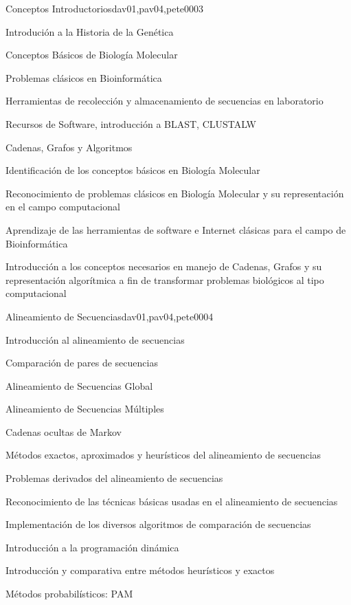 \begin{syllabus}
\begin{unit}{Conceptos Introductorios}{dav01,pav04,pete00}{0}{3}
\begin{topics}
        \item Introdución a la Historia de la Genética
        \item Conceptos Básicos de Biología Molecular
        \item Problemas clásicos en Bioinformática
        \item Herramientas de recolección y almacenamiento de secuencias en laboratorio
        \item Recursos de Software, introducción a BLAST, CLUSTALW
        \item Cadenas, Grafos y Algoritmos
    \end{topics}
    \begin{learningoutcomes}
        \item Identificación de los conceptos básicos en Biología Molecular
        \item Reconocimiento de problemas clásicos en Biología Molecular y su representación en el campo computacional
        \item Aprendizaje de las herramientas de software e Internet clásicas para el campo de Bioinformática
        \item Introducción a los conceptos necesarios en manejo de Cadenas, Grafos y su representación algorítmica a fin de transformar problemas biológicos al tipo computacional
    \end{learningoutcomes}
\end{unit}

\begin{unit}{Alineamiento de Secuencias}{dav01,pav04,pete00}{0}{4}
\begin{topics}
        \item Introducción al alineamiento de secuencias
        \item Comparación de pares de secuencias
        \item Alineamiento de Secuencias Global
        \item Alineamiento de Secuencias Múltiples
        \item Cadenas ocultas de Markov
        \item Métodos exactos, aproximados y heurísticos del alineamiento de secuencias
        \item Problemas derivados del alineamiento de secuencias
    \end{topics}
    \begin{learningoutcomes}
        \item Reconocimiento de las técnicas básicas usadas en el alineamiento de secuencias
        \item Implementación de los diversos algoritmos de comparación de secuencias
        \item Introducción a la programación dinámica
        \item Introducción y comparativa entre métodos heurísticos y exactos
        \item Métodos probabilísticos: PAM
    \end{learningoutcomes}
\end{unit}


\end{syllabus}
